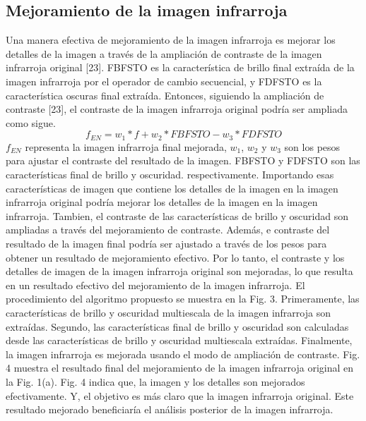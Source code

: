 \documentclass[a4paper, 11 pt, conference]{ieeeconf}      %
\begin{document}
\subsection{Mejoramiento de la imagen infrarroja}
Una manera efectiva de mejoramiento de la imagen infrarroja es mejorar los detalles de la imagen a trav\'es de la ampliaci\'on de contraste de la imagen infrarroja original [23]. FBFSTO es la caracter\'istica de brillo final extra\'ida de la imagen infrarroja por el operador de cambio secuencial, y FDFSTO es la caracter\'istica oscuras final extra\'ida. Entonces, siguiendo la ampliaci\'on de contraste [23], el contraste de la imagen infrarroja original podr\'ia ser ampliada como sigue. 
$$
f_{EN} = w_1  *  f + w_2 * FBFSTO - w_3 *FDFSTO
$$
$f_{EN}$ representa la imagen infrarroja final mejorada, $w_1$, $w_2$ y $w_3$ son los pesos para ajustar el contraste del resultado de la imagen.
FBFSTO y FDFSTO son las caracter\'isticas final de brillo y oscuridad. respectivamente. Importando esas caracter\'isticas de imagen que contiene los detalles de la imagen en la imagen infrarroja original podr\'ia mejorar los detalles de la imagen en la imagen infrarroja. Tambien, el contraste de las caracter\'isticas de brillo y oscuridad son ampliadas a trav\'es del mejoramiento de contraste. Adem\'as, e contraste del resultado de la imagen final  podr\'ia ser ajustado a trav\'es de los pesos para obtener un resultado de mejoramiento efectivo. Por lo tanto, el contraste y los detalles de imagen de la imagen infrarroja original son mejoradas, lo que resulta en un resultado efectivo del mejoramiento de la imagen infrarroja.
El procedimiento del algoritmo propuesto se muestra en la Fig. 3. Primeramente, las caracter\'isticas de brillo y oscuridad multiescala de la imagen infrarroja son extra\'idas. Segundo, las caracter\'isticas final de brillo y oscuridad son calculadas desde las caracter\'isticas de brillo y oscuridad multiescala extra\'idas. Finalmente, la imagen infrarroja es mejorada usando el modo de ampliaci\'on de contraste. Fig. 4 muestra el resultado final del mejoramiento de la imagen infrarroja original en la Fig. 1(a). Fig. 4 indica que, la imagen y los detalles son mejorados efectivamente. Y, el objetivo es m\'as claro que la imagen infrarroja original. Este resultado mejorado beneficiar\'ia el an\'alisis posterior de la imagen infrarroja.
\end{document}
